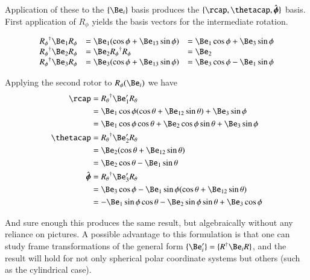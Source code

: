 \documentclass{article}
\newcommand{\phicap}[0]{\hat{\boldsymbol{\phi}}}
\begin{document}
Application of these to the $\{\Be_i\}$ basis produces the $\{\rcap, \thetacap, \phicap\}$ basis.  First application 
of $R_\phi$ yields the basis vectors for the intermediate rotation.

\begin{align*}
\begin{array}{l l l}
{R_\phi}^\dagger \Be_1 R_\phi &= \Be_1 (\cos\phi + \Be_{13} \sin\phi) &= \Be_1 \cos\phi + \Be_3 \sin\phi \\
{R_\phi}^\dagger \Be_2 R_\phi &= \Be_2 {R_\phi}^\dagger R_\phi &= \Be_2 \\
{R_\phi}^\dagger \Be_3 R_\phi &= \Be_3 (\cos\phi + \Be_{13} \sin\phi) &= \Be_3 \cos\phi - \Be_1 \sin\phi \\
\end{array}
\end{align*}

Applying the second rotor to $R_\phi(\Be_i)$ we have
\begin{align*}
\rcap 
&= {R_\theta}^\dagger \Be_1' R_\theta \\
&=
\Be_1 \cos\phi (\cos\theta + \Be_{12} \sin\theta)
+ \Be_3 \sin\phi \\
&=
\Be_1 \cos\phi \cos\theta 
+ \Be_2 \cos\phi \sin\theta
+ \Be_3 \sin\phi \\
\thetacap
&= {R_\theta}^\dagger \Be_2' R_\theta \\
&= \Be_2 (\cos\theta + \Be_{12} \sin\theta) \\
&= \Be_2 \cos\theta - \Be_1 \sin\theta \\
\phicap
&= {R_\theta}^\dagger \Be_3' R_\theta \\
&= \Be_3 \cos\phi - \Be_1 \sin\phi (\cos\theta + \Be_{12} \sin\theta) \\
&= 
- \Be_1 \sin\phi \cos\theta 
- \Be_2 \sin\phi \sin\theta 
+ \Be_3 \cos\phi
\\
\end{align*}

And sure enough this produces the same result, but algebraically without any reliance on pictures.  A possible
advantage to this formulation is that one can study 
frame transformations of the general form $\{\Be_i'\} = \{ R^\dagger \Be_i R \}$, and the result will hold for
not only spherical polar coordinate systems but others (such as the cylindrical case).

\end{document}
